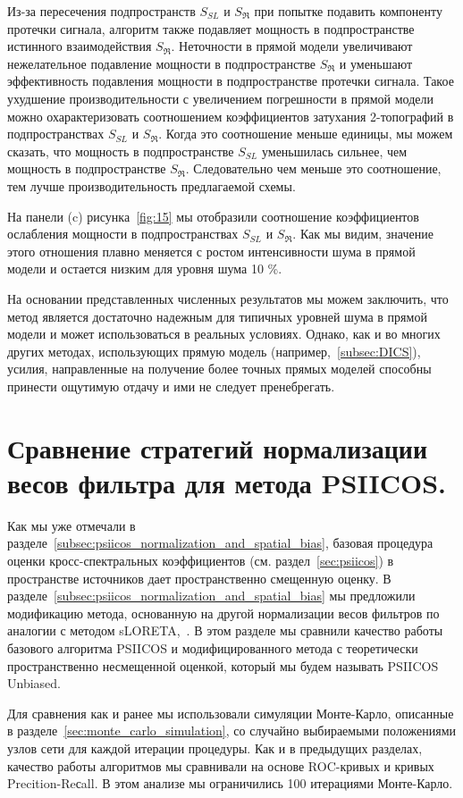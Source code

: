 Из-за пересечения подпространств $S_{SL}$ и $S_{\Re} $ при попытке
подавить компоненту протечки сигнала, алгоритм также подавляет мощность в
подпространстве истинного взаимодействия $S_{\Re}$. Неточности в прямой модели
увеличивают нежелательное подавление мощности в подпространстве $S_{\Re} $ и уменьшают
эффективность подавления мощности в подпространстве протечки сигнала.
Такое ухудшение производительности с увеличением погрешности в прямой модели
можно охарактеризовать соотношением коэффициентов затухания 2-топографий в подпространствах $S_{SL}$ и $S_{\Re}$.
Когда это соотношение меньше единицы, мы можем сказать, что мощность в подпространстве $S_{SL}$
уменьшилась сильнее, чем мощность в подпространстве $ S_{\Re}$. Следовательно
чем меньше это соотношение, тем лучше производительность предлагаемой схемы.

На панели (c) рисунка~\ref{fig:15} мы отобразили соотношение коэффициентов ослабления мощности в подпространствах
$S_{SL}$ и $ S_{\Re}$. Как мы видим, значение этого отношения плавно меняется с
ростом интенсивности шума в прямой модели и остается низким для уровня шума 10 \%.

На основании представленных численных результатов мы можем заключить, что метод
является достаточно надежным для типичных уровней шума в прямой модели и может
использоваться в реальных условиях.  Однако, как и во многих других методах,
использующих прямую модель (например,~\ref{subsec:DICS}), усилия, направленные на
получение более точных прямых моделей способны принести ощутимую отдачу и ими
не следует пренебрегать.



\section{Сравнение стратегий нормализации весов фильтра для метода PSIICOS.}
Как мы уже отмечали в разделе~\ref{subsec:psiicos_normalization_and_spatial_bias},
базовая процедура оценки кросс-спектральных коэффициентов (см.
раздел~\ref{sec:psiicos}) в пространстве источников дает пространственно смещенную оценку.
В разделе~\ref{subsec:psiicos_normalization_and_spatial_bias} мы предложили модификацию
метода, основанную на другой нормализации весов фильтров по аналогии с методом sLORETA,~\cite{Pascual-Marqui2002}.
В этом разделе мы сравнили качество работы базового алгоритма PSIICOS и модифицированного метода
с теоретически пространственно несмещенной оценкой, который мы будем называть PSIICOS Unbiased.

Для сравнения как и ранее мы использовали симуляции Монте-Карло,
описанные в разделе~\ref{sec:monte_carlo_simulation}, со случайно выбираемыми положениями узлов сети
для каждой итерации процедуры. Как и в предыдущих разделах, качество работы алгоритмов мы сравнивали
на основе ROC-кривых и кривых Precition-Reсall. В этом анализе мы ограничились 100 итерациями Монте-Карло.

